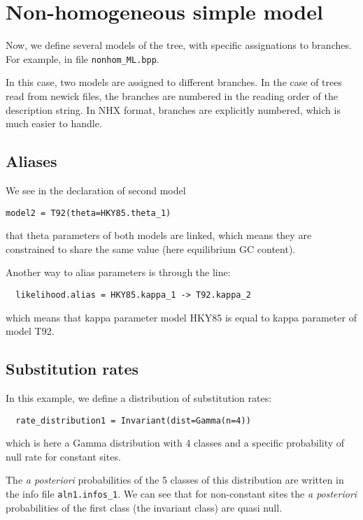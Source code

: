\documentclass{article}
\begin{document}
\section{Non-homogeneous simple model}

Now, we define several models of the tree, with specific assignations
to branches. For example, in file \verb#nonhom_ML.bpp#.

In this case, two models are assigned to different branches. In the
case of trees read from newick files, the branches are numbered in the
reading order of the description string. In NHX format, branches are
explicitly numbered, which is much easier to handle.

\subsection*{Aliases}

We see in the declaration of second model

\begin{verbatim}
model2 = T92(theta=HKY85.theta_1)
\end{verbatim}

that theta parameters of both models are linked, which means they are
constrained to share the same value (here equilibrium GC content).

Another way to alias parameters is through the line:

\begin{verbatim}
  likelihood.alias = HKY85.kappa_1 -> T92.kappa_2
\end{verbatim}

which means that kappa parameter model HKY85 is equal to kappa
parameter of model T92.

\subsection*{Substitution rates}

In this example, we define a distribution of substitution rates:

\begin{verbatim}
  rate_distribution1 = Invariant(dist=Gamma(n=4))
\end{verbatim}

which is here a Gamma distribution with 4 classes and a specific
probability of null rate for constant sites.

The \textit{a posteriori} probabilities of the 5 classes of this
distribution are written in the info file \verb|aln1.infos_1|. We can
see that for non-constant sites the \textit{a posteriori}
probabilities of the first class (the invariant class) are quasi null.
\end{document}
